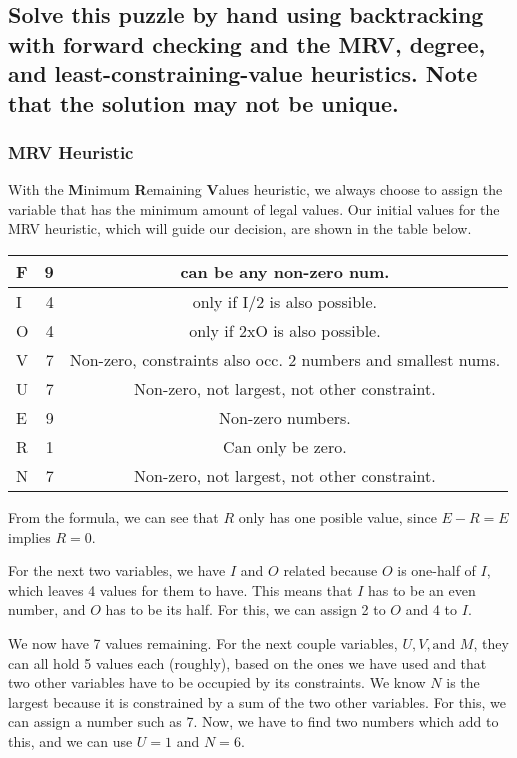 \documentclass{article}
\begin{document}
	\subsection{Solve this puzzle by hand using backtracking with forward checking and the MRV, degree, and 
	least-constraining-value heuristics. Note that the solution may not be unique.}
		\subsubsection{MRV Heuristic}
			With the \textbf{M}inimum \textbf{R}emaining \textbf{V}alues heuristic, we always choose to 
			assign the variable that has the minimum amount of legal values. Our initial values for the
			MRV heuristic, which will guide our decision, are shown in the table below.
			\begin{center}
				\begin{tabular}{|l | r | c |}
					\hline
						F  & 9 & can be any non-zero num.\\\hline
						I  & 4 & only if I/2 is also possible.\\\hline
						O  & 4 & only if 2xO is also possible.\\\hline
						V  & 7 & Non-zero, constraints also occ. 2 numbers and smallest nums.\\\hline
						U  & 7 & Non-zero, not largest, not other constraint.\\\hline
						E  & 9 & Non-zero numbers.\\\hline
						R  & 1 & Can only be zero.\\\hline
						N  & 7 & Non-zero, not largest, not other constraint.\\
					\hline
				\end{tabular}
			\end{center}
			From the formula, we can see
			that $R$ only has one posible value, since $E - R = E$  implies $R = 0$.

			For the next two variables, we have $I$ and $O$ related because $O$ is one-half of $I$, which leaves
			4 values for them to have. This means
			that $I$ has to be an even number, and $O$ has to be its half. For this, we can assign 2 to $O$ and 
			4 to $I$. 

			We now have 7 values remaining. 
			For the next couple variables, $U, V,\textrm{and } M$, they can all hold 5 values each (roughly), 
			based on the ones we have used and that two other variables have to be occupied by its constraints. 
			We know $N$ is the largest because it is constrained by a sum of the two other variables. For 
			this, we can assign a number such as 7. Now, we have to find two numbers which add to this, 
			and we can use $U=1$ and $N = 6$.
\end{document}
